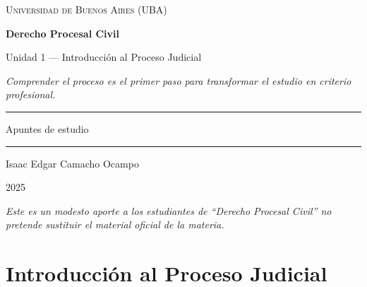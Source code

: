 \documentclass[12pt,oneside]{book}
\newcommand{\universidad}{Universidad de Buenos Aires (UBA)}
\newcommand{\materia}{Derecho Procesal Civil}
\newcommand{\titulo}{Unidad 1 --- Introducción al Proceso Judicial}
\newcommand{\autor}{Isaac Edgar Camacho Ocampo}
\newcommand{\anio}{2025}
\begin{document}
\begin{titlepage}

\thispagestyle{empty}

\begin{center}

\vspace*{1cm}

{\large \textsc{\universidad}}

\vspace{3cm}

{\Huge \textbf{\materia}}

\vspace{1cm}

{\LARGE \titulo}

\vspace{0.8cm}

\textit{Comprender el proceso es el primer paso para transformar el estudio en criterio profesional.}

\vspace{1.2cm}

\rule{0.70\textwidth}{0.5pt}

\vspace{0.5cm}

{\large Apuntes de estudio}

\vspace{0.5cm}

\rule{0.70\textwidth}{0.5pt}

\vfill

{\large \autor}

\vspace{0.3cm}

{\large \anio}

\end{center}

\vfill

\begin{flushleft}
\textit{Este es un modesto aporte a los estudiantes de ``Derecho Procesal Civil'' no pretende sustituir el material oficial de la materia.}
\end{flushleft}

\end{titlepage}

\tableofcontents


\chapter{Introducción al Proceso Judicial}
\end{document}
